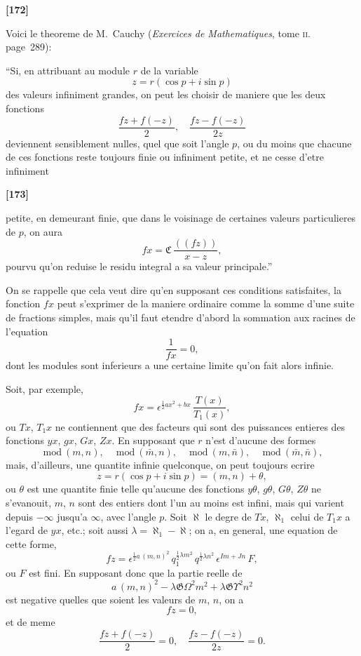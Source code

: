 \documentclass[11pt,a4paper]{book}
\providecommand{\modd}{\ \mathrm{mod}\ }
\begin{document}
\textbf{[172]}

Voici le theoreme de M.~Cauchy (\textit{Exercices de Mathematiques}, tome \textsc{ii}. page~289):

``Si, en attribuant au module $r$ de la variable
\[z = r(\cos p + i\sin p)\]
des valeurs infiniment grandes, on peut les choisir de maniere que les deux fonctions
\[\frac{fz + f(-z)}{2},\quad \frac{fz - f(-z)}{2z}\]
deviennent sensiblement nulles, quel que soit l'angle $p$, ou du moins que chacune de
ces fonctions reste toujours finie ou infiniment petite, et ne cesse d'etre infiniment

\textbf{[173]}

petite, en demeurant finie, que dans le voisinage de certaines valeurs particulieres de $p$,
on aura
\[fx = \boldsymbol{\mathfrak{C}}\, \frac{((fz))}{x - z},\]
pourvu qu'on reduise le residu integral a sa valeur principale.''

On se rappelle que cela veut dire qu'en supposant ces conditions satisfaites, la
fonction $fx$ peut s'exprimer de la maniere ordinaire comme la somme d'une suite de
fractions simples, mais qu'il faut etendre d'abord la sommation aux racines de l'equation
\[\frac{1}{fx} = 0,\]
dont les modules sont inferieurs a une certaine limite qu'on fait alors infinie.

Soit, par exemple,
\begin{equation}
fx = \epsilon^{\frac{1}{2}ax^2 + bx}\, \frac{T(x)}{T_1(x)}, \tag{33}
\end{equation}
ou $Tx$, $T_1x$ ne contiennent que des facteurs qui sont des puissances entieres des
fonctions $yx$, $gx$, $Gx$, $Zx$. En supposant que $r$ n'est d'aucune des formes
\[\modd(m, n),\quad \modd(\bar{m}, n),\quad \modd(m, \bar{n}),\quad \modd(\bar{m}, \bar{n}),\]
mais, d'ailleurs, une quantite infinie quelconque, on peut toujours ecrire
\begin{equation}
z = r(\cos p + i\sin p) = (m, n) + \theta, \tag{34}
\end{equation}
ou $\theta$ est une quantite finie telle qu'aucune des fonctions $y\theta$, $g\theta$, $G\theta$, $Z\theta$ ne s'evanouit,
$m$, $n$ sont des entiers dont l'un au moins est infini, mais qui varient depuis $-\infty$
jusqu'a $\infty$, avec l'angle $p$. Soit $\aleph$ le degre de $Tx$, $\aleph_1$ celui de $T_1x$ a l'egard de $yx$,
etc.; soit aussi $\lambda = \aleph_1 - \aleph$; on a, en general, une equation de cette forme,
\begin{equation}
fz = \epsilon^{\frac{1}{2}a\, (m, n)^2}\, q_1^{\frac{1}{2}\lambda m^2}\, q^{\frac{1}{2}\lambda n^2}\, \epsilon^{Im + Jn}\, F, \tag{35}
\end{equation}
ou $F$ est fini. En supposant donc que la partie reelle de
\begin{equation}
a\, (m, n)^2 - \lambda\mathfrak{G}\Omega^2 m^2 + \lambda\mathfrak{G}\Upsilon^2 n^2 \tag{36}
\end{equation}
est negative quelles que soient les valeurs de $m$, $n$, on a
\[fz = 0,\]
et de meme
\[\frac{fz + f(-z)}{2} = 0,\quad \frac{fz - f(-z)}{2z} = 0.\]
\end{document}
